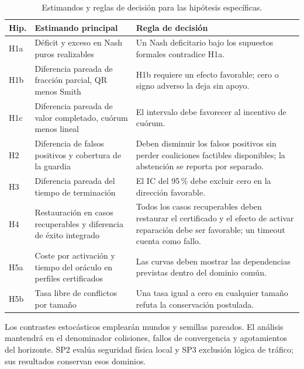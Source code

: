 \begin{table}[H]
  \centering
  \caption{Estimandos y reglas de decisión para las hipótesis específicas.}
  \label{tab:hypothesis-decision-rules}
  \footnotesize
  \begin{tabularx}{\textwidth}{p{1.0cm} p{5.0cm} Y}
    \toprule
    Hip. & Estimando principal & Regla de decisión \\
    \midrule
    H1a & Déficit y exceso en Nash puros realizables &
    Un Nash deficitario bajo los supuestos formales contradice H1a. \\
    H1b & Diferencia pareada de fracción parcial, QR menos Smith &
    H1b requiere un efecto favorable; cero o signo adverso la deja sin apoyo. \\
    H1c & Diferencia pareada de valor completado, cuórum menos lineal &
    El intervalo debe favorecer al incentivo de cuórum. \\
    H2 & Diferencia de falsos positivos y cobertura de la guardia &
    Deben disminuir los falsos positivos sin perder coaliciones factibles
    disponibles; la abstención se reporta por separado. \\
    H3 & Diferencia pareada del tiempo de terminación &
    El IC del 95\,\% debe excluir cero en la dirección favorable. \\
    H4 & Restauración en casos recuperables y diferencia de éxito integrado &
    Todos los casos recuperables deben restaurar el certificado y el efecto de
    activar reparación debe ser favorable; un timeout cuenta como fallo. \\
    H5a & Coste por activación y tiempo del oráculo en perfiles certificados &
    Las curvas deben mostrar las dependencias previstas dentro del dominio común. \\
    H5b & Tasa libre de conflictos por tamaño &
    Una tasa igual a cero en cualquier tamaño refuta la conservación postulada. \\
    \bottomrule
  \end{tabularx}
  \viuownsource
\end{table}

Los contrastes estocásticos emplearán mundos y semillas pareados. El análisis
mantendrá en el denominador colisiones, fallos de convergencia y agotamientos del
horizonte. SP2 evalúa seguridad física local y SP3 exclusión lógica de tráfico;
sus resultados conservan esos dominios.
